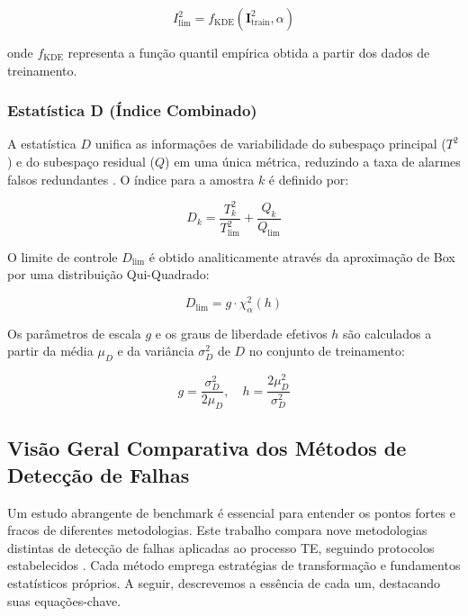 \documentclass[journal]{IEEEtran}
\begin{document}
\begin{equation}
I^2_{\text{lim}} = f_{\text{KDE}}(\mathbf{I}^2_{\text{train}}, \alpha)
\label{eq:i2_limit}
\end{equation}

onde $f_{\text{KDE}}$ representa a função quantil empírica obtida a partir dos dados de treinamento.

\subsubsection{Estatística D (Índice Combinado)}
\label{subsubsection:d_statistic}

A estatística $D$ unifica as informações de variabilidade do subespaço principal ($T^2$) e do subespaço residual ($Q$) em uma única métrica, reduzindo a taxa de alarmes falsos redundantes \cite{yue2001}. O índice para a amostra $k$ é definido por:

\begin{equation}
D_k = \frac{T^2_k}{T^2_{\text{lim}}} + \frac{Q_k}{Q_{\text{lim}}}
\label{eq:d_statistic}
\end{equation}

O limite de controle $D_{\text{lim}}$ é obtido analiticamente através da aproximação de Box por uma distribuição Qui-Quadrado:

\begin{equation}
D_{\text{lim}} = g \cdot \chi^2_{\alpha}(h)
\label{eq:d_limit}
\end{equation}

Os parâmetros de escala $g$ e os graus de liberdade efetivos $h$ são calculados a partir da média $\mu_D$ e da variância $\sigma^2_D$ de $D$ no conjunto de treinamento:

\begin{equation}
g = \frac{\sigma^2_D}{2\mu_D}, \quad h = \frac{2\mu_D^2}{\sigma^2_D}
\end{equation}

\subsection{Visão Geral Comparativa dos Métodos de Detecção de Falhas}
\label{subsec:methods_overview}

Um estudo abrangente de benchmark \cite{yin2012, germano2016} é essencial para entender os pontos fortes e fracos de diferentes metodologias. Este trabalho compara nove metodologias distintas de detecção de falhas aplicadas ao processo TE, seguindo protocolos estabelecidos \cite{venkatasubramanian2003}. Cada método emprega estratégias de transformação e fundamentos estatísticos próprios. A seguir, descrevemos a essência de cada um, destacando suas equações-chave.
\end{document}
